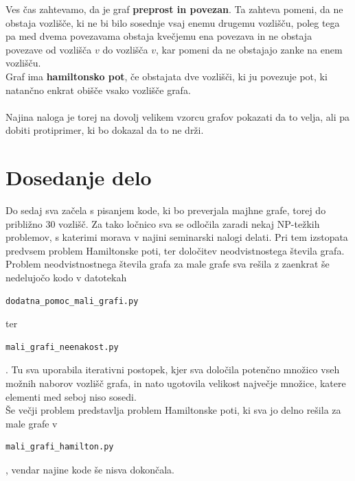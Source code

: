 \documentclass[12pt,a4paper]{amsart}
\begin{document}
Ves čas zahtevamo, da je graf \textbf{preprost in povezan}. Ta zahteva pomeni, da ne obstaja vozlišče, ki ne bi bilo sosednje vsaj enemu drugemu vozlišču, poleg tega pa med dvema povezavama obstaja kvečjemu ena povezava in ne obstaja  povezave od vozlišča $v$ do vozlišča $v$, kar pomeni da ne obstajajo zanke na enem vozlišču.\\
 
Graf ima \textbf{hamiltonsko pot}, če obstajata dve vozlišči, ki ju povezuje pot, ki natančno enkrat obišče vsako vozlišče grafa.\\
\ \\
Najina naloga je torej na dovolj velikem vzorcu grafov pokazati da to velja, ali pa dobiti protiprimer, ki bo dokazal da to ne drži.\\
\section{Dosedanje delo}
Do sedaj sva začela s pisanjem kode, ki bo preverjala majhne grafe, torej do približno $30$ vozlišč. Za tako ločnico sva se odločila zaradi nekaj NP-težkih problemov, s katerimi morava v najini seminarski nalogi delati. Pri tem izstopata predvsem problem Hamiltonske poti, ter določitev neodvistnostega števila grafa. \\
Problem neodvistnostnega števila grafa za male grafe sva rešila z zaenkrat še nedelujočo kodo v datotekah \begin{verbatim}dodatna_pomoc_mali_grafi.py\end{verbatim} ter \begin{verbatim}mali_grafi_neenakost.py\end{verbatim}. Tu sva uporabila iterativni postopek, kjer sva določila potenčno množico vseh možnih naborov vozlišč grafa, in nato ugotovila velikost največje množice, katere elementi med seboj niso sosedi.\\
Še večji problem predstavlja problem Hamiltonske poti, ki sva jo delno rešila za male grafe v \begin{verbatim}mali_grafi_hamilton.py\end{verbatim}, vendar najine kode še nisva dokončala. \\
\end{document}
